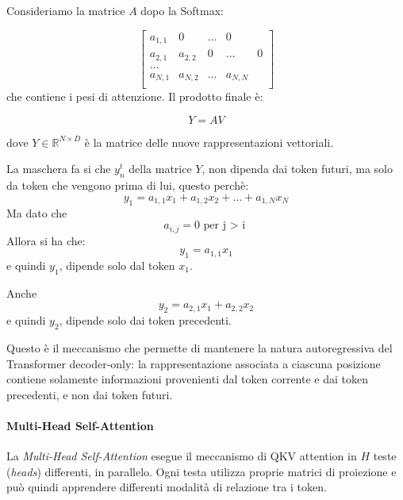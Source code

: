 Consideriamo la matrice $A$ dopo la Softmax:

\begin{equation}
\begin{bmatrix}
a_{1,1} & 0 & \dots & 0  \\
a_{2,1} & a_{2,2} & 0 & \dots & 0 \\
\dots \\
a_{N,1} & a_{N,2} & \dots & a_{N,N} \\
\end{bmatrix}
\end{equation}
che contiene i pesi di attenzione. Il prodotto finale è:

\begin{equation}
Y=AV
\end{equation}

dove $Y\in\mathbb{R}^{N\times D}$ è la matrice delle nuove rappresentazioni vettoriali.

La maschera fa si che $y_n^t$ della matrice $Y$, non dipenda dai token futuri, ma solo da token che vengono prima di lui, questo perchè:
\begin{equation}
    y_1 = a_{1,1} x_1 + a_{1,2} x_2 + \dots + a_{1,N} x_N
\end{equation}
Ma dato che
\[
a_{i,j} = 0 \text{ per j > i }
\]
Allora si ha che:
\begin{equation}
    y_1 = a_{1,1} x_1
\end{equation}
e quindi $y_1$, dipende solo dal token $x_1$.

Anche 
\begin{equation}
    y_2 = a_{2,1} x_1 + a_{2,2} x_2
\end{equation}
e quindi $y_2$, dipende solo dai token precedenti.

Questo è il meccanismo che permette di mantenere la natura autoregressiva del Transformer decoder-only: la rappresentazione associata a ciascuna posizione contiene solamente informazioni provenienti dal token corrente e dai token precedenti, e non dai token futuri.

\paragraph{Multi-Head Self-Attention}

La \textit{Multi-Head Self-Attention} esegue il meccanismo di QKV attention in $H$ teste (\textit{heads}) differenti, in parallelo. Ogni testa utilizza proprie matrici di proiezione e può quindi apprendere differenti modalità di relazione tra i token.

